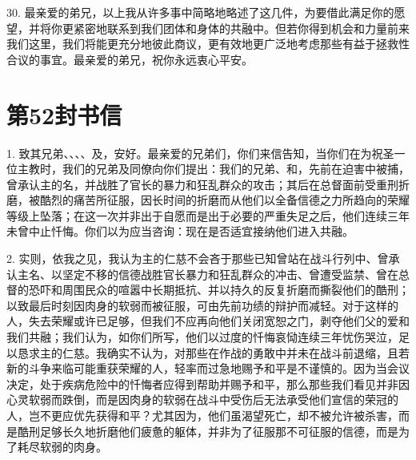 30. 最亲爱的弟兄，以上我从许多事中简略地略述了这几件，为要借此满足你的愿望，并将你更紧密地联系到我们团体和身体的共融中。但若你得到机会和力量前来我们这里，我们将能更充分地彼此商议，更有效地更广泛地考虑那些有益于拯救性合议的事宜。最亲爱的弟兄，祝你永远衷心平安。\par



\section{第52封书信}

\par

\par

1. 致其兄弟、、、、及，安好。最亲爱的兄弟们，你们来信告知，当你们在为祝圣一位主教时，我们的兄弟及同僚向你们提出：我们的兄弟、和，先前在迫害中被捕，曾承认主的名，并战胜了官长的暴力和狂乱群众的攻击；其后在总督面前受重刑折磨，被酷烈的痛苦所征服，因长时间的折磨而从他们以全备信德之力所趋向的荣耀等级上坠落；在这一次并非出于自愿而是出于必要的严重失足之后，他们连续三年未曾中止忏悔。你们以为应当咨询：现在是否适宜接纳他们进入共融。\par

2. 实则，依我之见，我认为主的仁慈不会吝于那些已知曾站在战斗行列中、曾承认主名、以坚定不移的信德战胜官长暴力和狂乱群众的冲击、曾遭受监禁、曾在总督的恐吓和周围民众的喧嚣中长期抵抗、并以持久的反复折磨而撕裂他们的酷刑；以致最后时刻因肉身的软弱而被征服，可由先前功绩的辩护而减轻。对于这样的人，失去荣耀或许已足够，但我们不应再向他们关闭宽恕之门，剥夺他们父的爱和我们共融；我们认为，如你们所写，他们以过度的忏悔哀恸连续三年忧伤哭泣，足以恳求主的仁慈。我确实不认为，对那些在作战的勇敢中并未在战斗前退缩，且若新的斗争来临可能重获荣耀的人，轻率而过急地赐予和平是不谨慎的。因为当会议决定，处于疾病危险中的忏悔者应得到帮助并赐予和平，那么那些我们看见并非因心灵软弱而跌倒，而是因肉身的软弱在战斗中受伤后无法承受他们宣信的荣冠的人，岂不更应优先获得和平？尤其因为，他们虽渴望死亡，却不被允许被杀害，而是酷刑足够长久地折磨他们疲惫的躯体，并非为了征服那不可征服的信德，而是为了耗尽软弱的肉身。\par

